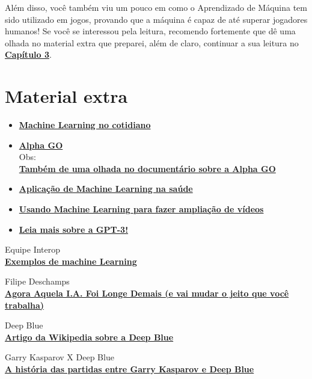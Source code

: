 \documentclass[12pt]{article}
\begin{document}
    Além disso, você também viu um pouco em como o Aprendizado de Máquina
    tem sido utilizado em jogos, provando que a máquina é capaz de até superar jogadores
    humanos! Se você se interessou pela leitura, recomendo fortemente que dê
    uma olhada no material extra que preparei, além de claro, continuar a sua leitura
    no \href{../Capitulo_03/Capitulo03.pdf}{\textbf{Capítulo 3}}.


    \newpage
    \section*{\centering Material extra}\label{sec:extra} %

    \begin{itemize}
        \item \href{http://datascienceacademy.com.br/blog/17-casos-de-uso-de-machine-learning/}{\textbf{Machine Learning no cotidiano}}
        \item \href{https://deepmind.com/research/case-studies/alphago-the-story-so-far}{\textbf{Alpha GO}} \\ Obs: \\ \href{https://youtu.be/WXuK6gekU1Y}{\textbf{Também de uma olhada no documentário sobre a Alpha GO}}
        \item \href{https://youtu.be/uGYJuOyIvzs}{\textbf{Aplicação de Machine Learning na saúde}}
        \item \href{https://youtu.be/AwmvwTopbas}{\textbf{Usando Machine Learning para fazer ampliação de vídeos}}
        \item \href{https://forbes.com.br/forbes-insider/2020/07/por-que-o-programa-de-inteligencia-artificial-gpt-3-e-incrivel-mas-superestimado/}{\textbf{Leia mais sobre a GPT-3!}}
    \end{itemize}

    \newpage

    \begin{thebibliography}{4}
        Equipe Interop \\
        \href{https://www.interop.com.br/blog/exemplos-de-machine-learning/}{\textbf{Exemplos de machine Learning}} 
        
        Filipe Deschamps \\
        \href{https://www.interop.com.br/blog/exemplos-de-machine-learning/}{\textbf{Agora Aquela I.A. Foi Longe Demais (e vai mudar o jeito que você trabalha)}}

        Deep Blue \\
        \href{https://pt.wikipedia.org/wiki/Deep_Blue}{\textbf{Artigo da Wikipedia sobre a Deep Blue}}
        
        Garry Kasparov X Deep Blue \\
        \href{https://pt.wikipedia.org/wiki/Deep_Blue}{\textbf{A história das partidas entre Garry Kasparov e Deep Blue}}
    \end{thebibliography}

    
\end{document}
